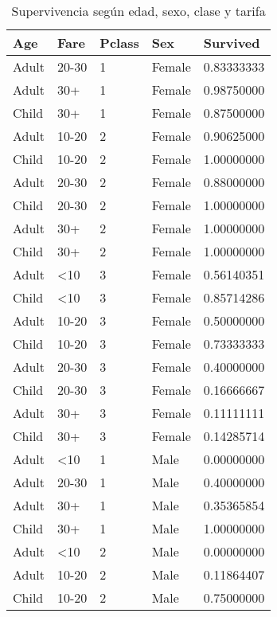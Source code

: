\begin{table}[H]
	\centering
	\caption{Supervivencia según edad, sexo, clase y tarifa}
	\label{tab:age-sex-fare-pclass}
	\begin{tabular}{|llll|l|}
		\hline
		Age   & Fare        & Pclass & Sex    & Survived   \\ \hline
		Adult & 20-30       & 1      & Female & 0.83333333 \\
		Adult & 30+         & 1      & Female & 0.98750000 \\
		Child & 30+         & 1      & Female & 0.87500000 \\
		Adult & 10-20       & 2      & Female & 0.90625000 \\
		Child & 10-20       & 2      & Female & 1.00000000 \\
		Adult & 20-30       & 2      & Female & 0.88000000 \\
		Child & 20-30       & 2      & Female & 1.00000000 \\
		Adult & 30+         & 2      & Female & 1.00000000 \\
		Child & 30+         & 2      & Female & 1.00000000 \\
		Adult & \textless10 & 3      & Female & 0.56140351 \\
		Child & \textless10 & 3      & Female & 0.85714286 \\
		Adult & 10-20       & 3      & Female & 0.50000000 \\
		Child & 10-20       & 3      & Female & 0.73333333 \\
		Adult & 20-30       & 3      & Female & 0.40000000 \\
		Child & 20-30       & 3      & Female & 0.16666667 \\
		Adult & 30+         & 3      & Female & 0.11111111 \\
		Child & 30+         & 3      & Female & 0.14285714 \\
		Adult & \textless10 & 1      & Male   & 0.00000000 \\
		Adult & 20-30       & 1      & Male   & 0.40000000 \\
		Adult & 30+         & 1      & Male   & 0.35365854 \\
		Child & 30+         & 1      & Male   & 1.00000000 \\
		Adult & \textless10 & 2      & Male   & 0.00000000 \\
		Adult & 10-20       & 2      & Male   & 0.11864407 \\
		Child & 10-20       & 2      & Male   & 0.75000000 \\

\end{tabular}
\end{table}
